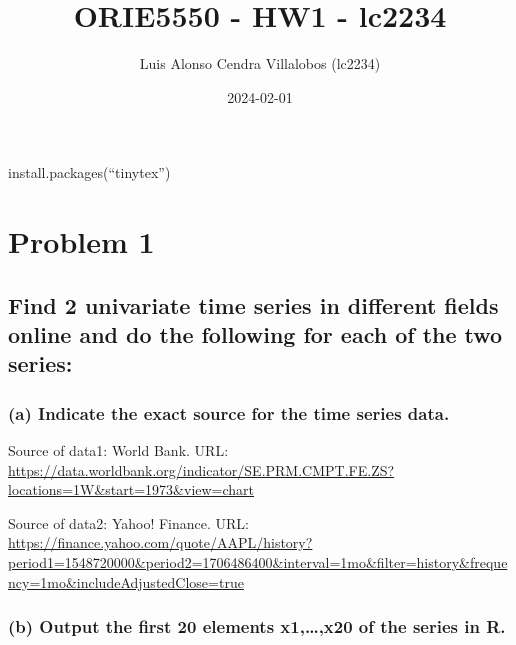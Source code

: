 \documentclass[
]{article}
\title{ORIE5550 - HW1 - lc2234}
\author{Luis Alonso Cendra Villalobos (lc2234)}
\date{2024-02-01}
\begin{document}
\maketitle

install.packages(``tinytex'')

\hypertarget{problem-1}{%
\section{Problem 1}\label{problem-1}}

\hypertarget{find-2-univariate-time-series-in-different-fields-online-and-do-the-following-for-each-of-the-two-series}{%
\subsection{Find 2 univariate time series in different fields online and
do the following for each of the two
series:}\label{find-2-univariate-time-series-in-different-fields-online-and-do-the-following-for-each-of-the-two-series}}

\hypertarget{a-indicate-the-exact-source-for-the-time-series-data.}{%
\subsubsection{(a) Indicate the exact source for the time series
data.}\label{a-indicate-the-exact-source-for-the-time-series-data.}}

Source of data1: World Bank. URL:
\url{https://data.worldbank.org/indicator/SE.PRM.CMPT.FE.ZS?locations=1W\&start=1973\&view=chart}

Source of data2: Yahoo! Finance. URL:
\url{https://finance.yahoo.com/quote/AAPL/history?period1=1548720000\&period2=1706486400\&interval=1mo\&filter=history\&frequency=1mo\&includeAdjustedClose=true}

\hypertarget{b-output-the-first-20-elements-x1x20-of-the-series-in-r.}{%
\subsubsection{(b) Output the first 20 elements x1,\ldots,x20 of the
series in
R.}\label{b-output-the-first-20-elements-x1x20-of-the-series-in-r.}}
\end{document}
